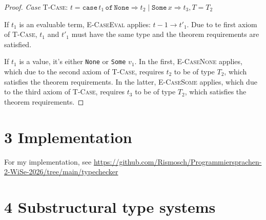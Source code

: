 \documentclass[13pt, a4paper]{article}
\begin{document}
\begin{enumerate}
\begin{proof}
\textit{Case} \textsc{T-Case}: $t= \texttt{case}\,t_1\,\texttt{of}\,\texttt{None}\Rightarrow t_2 \mid \texttt{Some}\, x \Rightarrow t_3, T = T_2$

If $t_1$ is an evaluable term, \textsc{E-CaseEval} applies: $t-1 \to t'_1$. Due to te first axiom of \textsc{T-Case}, $t_1$ and $t'_1$ must have the same type and the theorem requirements are satisfied.

If $t_1$ is a value, it's either \texttt{None} or \texttt{Some} $v_1$. In the first, \textsc{E-CaseNone} applies, which due to the second axiom of \textsc{T-Case}, requires $t_2$ to be of type $T_2$, which satisfies the theorem requirements. In the latter, \textsc{E-CaseSome} applies, which due to the third axiom of \textsc{T-Case}, requires $t_3$ to be of type $T_2$, which satisfies the theorem requirements.

\end{proof}

\end{enumerate}

\section*{3 Implementation}

For my implementation, see \url{https://github.com/Rismosch/Programmiersprachen-2-WiSe-2026/tree/main/typechecker}

\section*{4 Substructural type systems}
\end{document}

